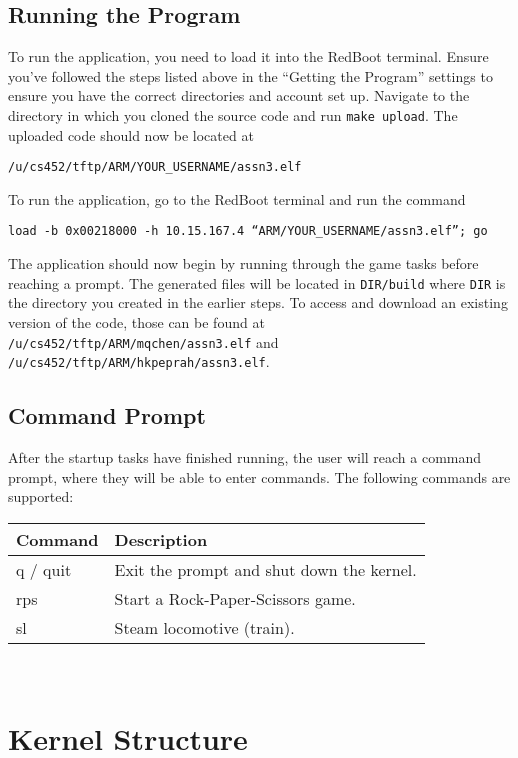 \documentclass[12pt]{article}
\begin{document}
\subsection{Running the Program}
To run the application, you need to load it into the RedBoot terminal.  Ensure you've followed the steps listed above in the ``Getting the Program'' settings to ensure you have the correct directories and account set up.  Navigate to the directory in which you cloned the source code and run \texttt{make upload}.  The uploaded code should now be located at
\begin{center}
  \texttt{/u/cs452/tftp/ARM/YOUR\_USERNAME/assn3.elf}
\end{center}
To run the application, go to the RedBoot terminal and run the command
\begin{center}
  \texttt{load -b 0x00218000 -h 10.15.167.4 ``ARM/YOUR\_USERNAME/assn3.elf''; go}
\end{center}
The application should now begin by running through the game tasks before reaching a prompt.  The generated files will be located in \texttt{DIR/build} where \texttt{DIR} is the directory you created in the earlier steps.  To access and download an existing version of the code, those can be found at \texttt{/u/cs452/tftp/ARM/mqchen/assn3.elf} and \texttt{/u/cs452/tftp/ARM/hkpeprah/assn3.elf}.
\\[1\baselineskip]

\subsection{Command Prompt}
After the startup tasks have finished running, the user will reach a command prompt, where they will be able to enter commands.  The following commands are supported:
\begin{center}
  \begin{tabular}{|l|l|}
    \hline
    {\bf Command } & {\bf Description} \\\hline
    q / quit & Exit the prompt and shut down the kernel. \\\hline
    rps & Start a Rock-Paper-Scissors game. \\\hline
    sl & Steam locomotive (train). \\\hline
  \end{tabular}
  \\[2\baselineskip]
\end{center}

\section{Kernel Structure}
\end{document}
